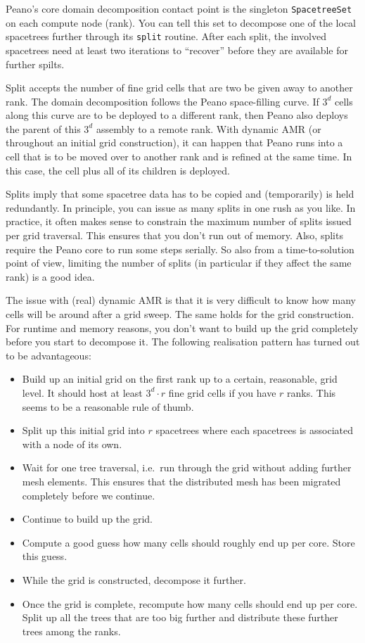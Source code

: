 Peano's core domain decomposition contact point is the singleton
\texttt{SpacetreeSet} on each compute node (rank).
You can tell this set to decompose one of the local spacetrees further through
its \texttt{split} routine.
After each split, the involved spacetrees need at least two iterations to
``recover'' before they are available for further spilts.


Split accepts the number of fine grid cells that are two be given away to
another rank.
The domain decomposition follows the Peano space-filling curve.
If $3^d$ cells along this curve are to be deployed to a different rank, then
Peano also deploys the parent of this $3^d$ assembly to a remote rank.
With dynamic AMR (or throughout an initial grid construction), it can happen
that Peano runs into a cell that is to be moved over to another rank and is
refined at the same time.
In this case, the cell plus all of its children is deployed.


\begin{remark}
 Splits imply that some spacetree data has to be copied and (temporarily) is
 held redundantly. In principle, you can issue as many splits in one rush as you
 like. In practice, it often makes sense to constrain the maximum number of
 splits issued per grid traversal. This ensures that you don't run out of
 memory. Also, splits require the Peano core to run some steps serially. 
 So also from a time-to-solution point of view, limiting the number of splits
 (in particular if they affect the same rank) is a good idea.
\end{remark}



The issue with (real) dynamic AMR is that it is very difficult to know how many
cells will be around after a grid sweep.
The same holds for the grid construction.
For runtime and memory reasons, you don't want to build up the grid completely
before you start to decompose it.
The following realisation pattern has turned out to be advantageous:
\begin{itemize}
  \item Build up an initial grid on the first rank up to a certain, reasonable,
  grid level. It should host at least $3^d \cdot r$ fine grid cells if you have
  $r$ ranks. This seems to be a reasonable rule of thumb.
  \item Split up this initial grid into $r$ spacetrees where each spacetrees is
  associated with a node of its own.
  \item Wait for one tree traversal, i.e.~run through the grid without adding
  further mesh elements. This ensures that the distributed mesh has been
  migrated completely before we continue.
  \item Continue to build up the grid.
  \item Compute a good guess how many cells should roughly end up per core.
  Store this guess.
  \item While the grid is constructed, decompose it further.
  \item Once the grid is complete, recompute how many cells should end up per
  core. Split up all the trees that are too big further and distribute these
  further trees among the ranks.
\end{itemize}

 
